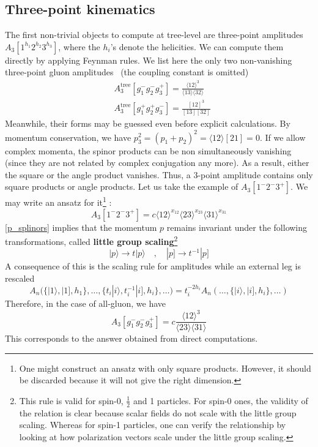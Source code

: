 \subsection*{Three-point kinematics}
The first non-trivial objects to compute at tree-level are three-point amplitudes $A_3[1^{h_1}2^{h_2}3^{h_3}]$, where the $h_i$'s denote the helicities.
We can compute them directly by applying Feynman rules. 
We list here the only two non-vanishing three-point gluon amplitudes~\cite{Benincasa:2007xk} (the coupling constant is omitted)
\begin{equation}\label{a3mhv}
\begin{split}
& A^{\mathrm{tree}}_3[g_1^- g_2^- g_3^+] = \frac{\langle 12 \rangle^3}{\langle 13 \rangle \langle 32 \rangle}
\\
& A^{\mathrm{tree}}_3[g_1^+ g_2^+ g_3^-] = \frac{ [12]^3}{[13 ][ 32 ]}
\end{split}
\end{equation}
Meanwhile, their forms may be guessed even before explicit calculations.  
By momentum conservation, we have $p_3^2 = (p_1 + p_2)^2 = \langle 12\rangle[21] = 0$. 
If we allow complex momenta, the spinor products can be non simultaneously vanishing (since they are not related by complex conjugation any more). 
As a result, either the square or the angle product vanishes.
Thus, a 3-point amplitude contains only square products or angle products. 
Let us take the example of $A_3[1^{-}2^{-}3^{+}]$.
We may write an ansatz for it\footnote{One might construct an ansatz with only square products. However, it should be discarded because it will not give the right dimension.} :
\begin{equation}
A_3[1^{-}2^{-}3^{+}] = c\langle 12 \rangle^{x_{12}}\langle 23 \rangle^{x_{23}}\langle 31 \rangle^{x_{31}}
\end{equation}
\cref{p_splinors} implies that the momentum $p$ remains invariant under the following transformations, called \textbf{little group scaling}\footnote{This rule is valid for spin-0, $\frac{1}{2}$ and 1 particles. 
For spin-0 ones, the validity of the relation is clear because scalar fields do not scale with the little group scaling.
Whereas for spin-1 particles, one can verify the relationship by looking at how polarization vectors scale under the little group scaling.
}
\begin{equation}
|p\rangle \rightarrow t| p\rangle \quad,\quad 
|p]\rightarrow t^{-1} |p]
\end{equation} 
A consequence of this is the scaling rule for amplitudes while an external leg is rescaled
\begin{equation}
A_n \big(\{ |1\rangle, |1], h_1\},\ldots,\{t_i|i\rangle, t_i^{-1}|i], h_i\},\ldots\big) = 
t_i^{-2h_i}A_n(\ldots, \{|i\rangle,|i], h_i\},\ldots)
\end{equation}
Therefore, in the case of all-gluon, we have
\begin{equation}
A_3[g_1^-g_2^-g_3^+] = c\frac{\langle 12\rangle^3}{\langle 23 \rangle\langle 31\rangle}
\end{equation}
This corresponds to the answer obtained from direct computations.
%
%
